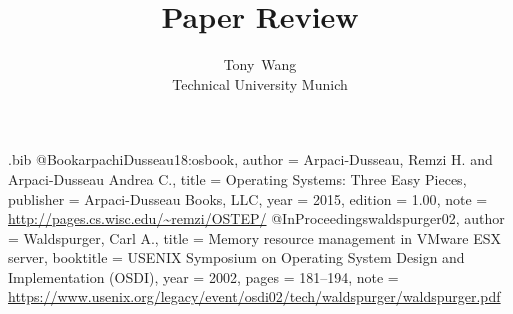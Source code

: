 \usepackage{filecontents}

\begin{filecontents}{\jobname.bib}
@Book{arpachiDusseau18:osbook,
  author =       {Arpaci-Dusseau, Remzi H. and Arpaci-Dusseau Andrea C.},
  title =        {Operating Systems: Three Easy Pieces},
  publisher =    {Arpaci-Dusseau Books, LLC},
  year =         2015,
  edition =      {1.00},
  note =         {\url{http://pages.cs.wisc.edu/~remzi/OSTEP/}}
}
@InProceedings{waldspurger02,
  author =       {Waldspurger, Carl A.},
  title =        {Memory resource management in {VMware ESX} server},
  booktitle =    {USENIX Symposium on Operating System Design and
                  Implementation (OSDI)},
  year =         2002,
  pages =        {181--194},
  note =         {\url{https://www.usenix.org/legacy/event/osdi02/tech/waldspurger/waldspurger.pdf}}}
\end{filecontents}



\date{}

\title{\Large \bf Paper Review}

\author{
{\rm Tony\ Wang}\\
Technical University Munich
} %

\maketitle



